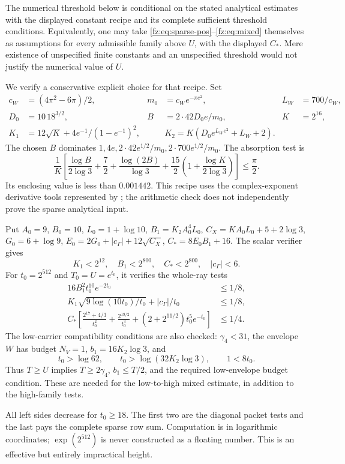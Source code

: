 \documentclass[11pt,a4paper]{article}
\numberwithin{equation}{section}
\theoremstyle{definition}\newtheorem{definition}[theorem]{Definition}
\theoremstyle{remark}\newtheorem{remark}[theorem]{Remark}
\begin{document}
The numerical threshold below is conditional on the stated analytical
estimates with the displayed constant recipe and its complete sufficient
threshold conditions. Equivalently, one may take
\eqref{fz:eq:sparse-pos}--\eqref{fz:eq:mixed} themselves as assumptions for
every admissible family above $U$, with the displayed $C_*$. Mere existence
of unspecified finite constants and an unspecified threshold would not
justify the numerical value of $U$.

We verify a conservative explicit choice for that recipe. Set
\begin{align*}
 c_W&=(4\pi^2-6\pi)/2,&m_0&=c_We^{-\pi e^2},&L_W&=700/c_W,\\
 D_0&=10\,18^{3/2},&B&=2\cdot42D_0e/m_0,&K&=2^{16},\\
 K_1&=12\sqrt K+4e^{-1}/(1-e^{-1})^2,&&
 K_2=K(D_0e^{L_We^2}+L_W+2).
\end{align*}
The chosen $B$ dominates $1,4e,2\cdot42e^{1/2}/m_0,2\cdot700e^{1/2}/m_0$.
The absorption test is
\[
 \frac1K\left[\frac{\log B}{2\log3}+\frac72+
 \frac{\log(2B)}{\log3}+\frac{15}2
       \left(1+\frac{\log K}{2\log3}\right)\right]\le\frac\pi2.
\]
Its enclosing value is less than $0.001442$. This recipe uses the
complex-exponent derivative tools represented by \cite{Erdelyi}; the
arithmetic check does not independently prove the sparse analytical input.

Put $A_0=9$, $B_0=10$, $L_0=1+\log10$,
$B_1=K_2A_0^4L_0$, $C_X=KA_0L_0+5+2\log3$,
$G_0=6+\log9$, $E_0=2G_0+|c_\Gamma|+12\sqrt{C_X}$,
$C_*=8E_0B_1+16$. The scalar verifier gives
\[
 K_1<2^{12},\quad B_1<2^{800},\quad C_*<2^{800},\quad |c_\Gamma|<6.
\]
For $t_0=2^{512}$ and $T_0=U=e^{t_0}$, it verifies the whole-ray tests
\begin{align*}
 16B_1^2t_0^{10}e^{-2t_0}&\le1/8,\\
 K_1\sqrt{9\log(10t_0)/t_0}+|c_\Gamma|/t_0&\le1/8,\\
 C_*\left[\frac{2^{17}+4/3}{t_0^2}+\frac{2^{19/2}}{t_0^3}
       +(2+2^{11/2})t_0^5e^{-t_0}\right]&\le1/4.
\end{align*}
The low-carrier compatibility conditions are also checked:
$\gamma_4<31$, the envelope $W$ has budget $N_V=1$,
$b_1=16K_2\log3$, and
\[
 t_0>\log62,\qquad
 t_0>\log(32K_2\log3),\qquad 1<8t_0.
\]
Thus $T\ge U$ implies $T\ge2\gamma_4$, $b_1\le T/2$, and the required
low-envelope budget condition. These are needed for the low-to-high mixed
estimate, in addition to the high-family tests.

All left sides decrease for $t_0\ge18$. The first two are the diagonal
packet tests and the last pays the complete sparse row sum. Computation
is in logarithmic coordinates; $\exp(2^{512})$ is never constructed as a
floating number. This is an effective but entirely impractical height.
\end{document}
